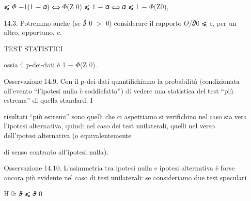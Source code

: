 \documentclass[a4paper,portrait,12pt]{article}
\begin{document}
\begin{flushleft}
⩽ $\Phi$ $-$1(1 $-$ 𝛼) ⟺ $\Phi$(Z 0) ⩽ 1 $-$ 𝛼 ⟺ 𝛼 ⩽ 1 $-$ $\Phi$(Z0),
\end{flushleft}





\begin{flushleft}
14.3. Potremmo anche (se 𝜗 0 $>$ 0) considerare il rapporto $\Theta$/𝜗0 ⩽ c, per un altro, opportuno, c.
\end{flushleft}










\begin{flushleft}
TEST STATISTICI
\end{flushleft}





\begin{flushleft}
ossia il p-dei-dati \`{e} 1 $-$ $\Phi$(Z 0).
\end{flushleft}


\begin{flushleft}
Osservazione 14.9. Con il p-dei-dati quantifichiamo la probabilit\`{a} (condizionata all'evento {``}l'ipotesi nulla \`{e} soddisfatta'') di vedere una statistica del test {``}più estrema'' di quella standard. I
\end{flushleft}


\begin{flushleft}
risultati {``}più estremi'' sono quelli che ci aspettiamo si verifichino nel caso sia vera l'ipotesi alternativa, quindi nel caso dei test unilaterali, quelli nel verso dell'ipotesi alternativa (o equivalentemente
\end{flushleft}


\begin{flushleft}
di senso contrario all'ipotesi nulla).
\end{flushleft}


\begin{flushleft}
Osservazione 14.10. L'asimmetria tra ipotesi nulla e ipotesi alternativa \`{e} forse ancora più evidente nel caso di test unilaterali: se consideriamo due test speculari
\end{flushleft}


\begin{flushleft}
H 0: 𝜗 ⩽ 𝜗 0
\end{flushleft}
\end{document}

